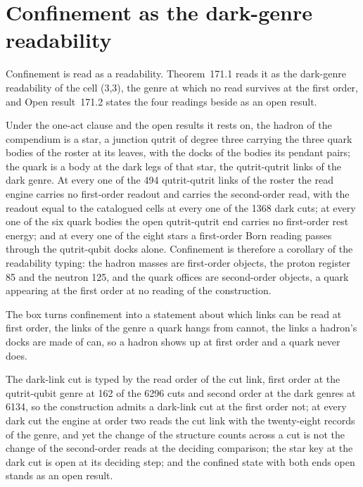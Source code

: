 \section{Confinement as the dark-genre readability}\label{mod:VII-1-confinement-as-the-dark-genre-readability}
\label{narr:open:7-1}Confinement is read as a readability. Theorem~171.1 reads it as the dark-genre readability of the cell (3,3), the genre at which no read survives at the first order, and Open result~171.2 states the four readings beside as an open result.
\begin{chconditional}\label{box:VII-1-confinement-as-the-dark-genre-readability:1}
Under the one-act clause and the open results it rests on, the hadron of the compendium is a star, a junction qutrit of degree three carrying the three quark bodies of the roster at its leaves, with the docks of the bodies its pendant pairs; the quark is a body at the dark legs of that star, the qutrit-qutrit links of the dark genre. At every one of the 494 qutrit-qutrit links of the roster the read engine carries no first-order readout and carries the second-order read, with the readout equal to the catalogued cells at every one of the 1368 dark cuts; at every one of the six quark bodies the open qutrit-qutrit end carries no first-order rest energy; and at every one of the eight stars a first-order Born reading passes through the qutrit-qubit docks alone. Confinement is therefore a corollary of the readability typing: the hadron masses are first-order objects, the proton register 85 and the neutron 125, and the quark offices are second-order objects, a quark appearing at the first order at no reading of the construction.
\end{chconditional}
The box turns confinement into a statement about which links can be read at first order, the links of the genre a quark hangs from cannot, the links a hadron's docks are made of can, so a hadron shows up at first order and a quark never does.
\begin{chwall}\label{box:VII-1-confinement-as-the-dark-genre-readability:2}
The dark-link cut is typed by the read order of the cut link, first order at the qutrit-qubit genre at 162 of the 6296 cuts and second order at the dark genres at 6134, so the construction admits a dark-link cut at the first order not; at every dark cut the engine at order two reads the cut link with the twenty-eight records of the genre, and yet the change of the structure counts across a cut is not the change of the second-order reads at the deciding comparison; the star key at the dark cut is open at its deciding step; and the confined state with both ends open stands as an open result.
\end{chwall}
